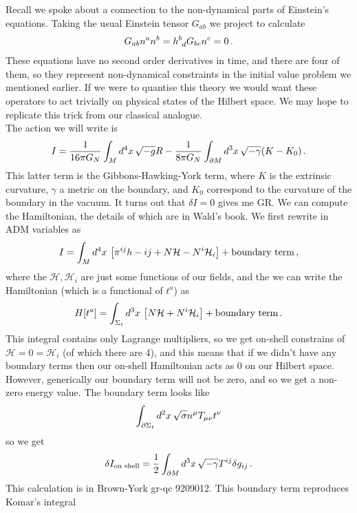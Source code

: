 \documentclass{article}
\begin{document}
\begin{remark}
	Recall we spoke about a connection to the non-dynamical parts of Einstein's equations. Taking the usual Einstein tensor $G_{ab}$ we project to calculate 
	\begin{align*}
		G_{ab} n^a n^b = h\indices{^b_d} G_{bc} n^c = 0 \, . 
	\end{align*}
These equations have no second order derivatives in time, and there are four of them, so they represent non-dynamical constraints in the initial value problem we mentioned earlier. If we were to quantise this theory we would want these operators to act trivially on physical states of the Hilbert space. We may hope to replicate this trick from our classical analogue. \\
The action we will write is 
\[
I = \frac{1}{16 \pi G_N} \int_{M} d^4x \, \sqrt{-g}R - \frac{1}{8 \pi G_N} \int_{\partial M} d^3x \, \sqrt{-\gamma} (K-K_0) \, . 
\]
This latter term is the Gibbons-Hawking-York term, where $K$ is the extrinsic curvature, $\gamma$ a metric on the boundary, and $K_0$ correspond to the curvature of the boundary in the vacuum. It turns out that $\delta I=0$ gives me GR. We can compute the Hamiltonian, the details of which are in Wald's book. We first rewrite in ADM variables as 
\[
I = \int_M d^4x \, \left[ \pi^{ij}h-{ij}+ N \mathcal{H} - N^i \mathcal{H}_i \right] + \text{boundary term} \, ,
\]
where the $\mathcal{H}, \mathcal{H}_i$ are just some functions of our fields, and the we can write the Hamiltonian (which is a functional of $t^a$) as 
\[
H[t^a] = \int_{\Sigma_t} d^3x \, \left[ N \mathcal{H} + N^i \mathcal{H}_i \right] + \text{boundary term} \, .
\]
This integral contains only Lagrange multipliers, so we get on-shell constrains of $\mathcal{H}=0=\mathcal{H}_i$ (of which there are 4), and this means that if we didn't have any boundary terms then our on-shell Hamiltonian acts as 0 on our Hilbert space. However, generically our boundary term will not be zero, and so we get a non-zero energy value. The boundary term looks like 
\[
\int_{\partial \Sigma_t} d^2x \, \sqrt{\sigma} n^{\mu} T_{\mu \nu} t^\nu
\]
so we get 
\[
\delta I_{\text{on shell}} = \frac{1}{2} \int_{\partial M} d^3 x \, \sqrt{-\gamma} T^{ij} \delta g_{ij}  \, .
\]
This calculation is in Brown-York gr-qc 9209012. This boundary term reproduces Komar's integral
\end{remark}


\end{document}
